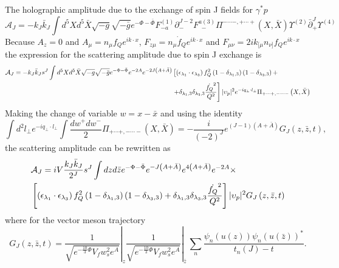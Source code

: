 \documentclass[a4paper,12pt]{article}
\begin{document}
The holographic amplitude due to the exchange of spin J fields for $\gamma^* p$
\begin{equation}
\mathcal{A}_J = - k_J \bar{k}_J \int d^5X d^5 \bar{X} \sqrt{-g} \sqrt{-\bar{g}} e^{-\Phi -\bar{\Phi}} F^{(1)}_{- a} \partial_{-}^{J-2} F^{a (3)}_{\, \, \, -} \Pi^{- \cdots -, + \cdots +} \left(X, \bar{X}\right) \Upsilon^{(2)} \bar{\partial}^J_{+} \Upsilon^{(4)}
\end{equation}
Because $A_z = 0$ and $A_\mu = n_\mu f_Q e^{i k \cdot x}$, $F_{z\mu} = n_\mu \dot{f}_Q e^{i k \cdot x}$ and $F_{\mu\nu} = 2 i k_{[\mu}n_{\nu]} f_Q e^{i k \cdot x}$
the expression for the scattering amplitude due to spin J exchange is
\begin{align}
\mathcal{A}_J = - k_J \bar{k}_J s^J \int d^5X d^5\bar{X} \sqrt{-g} \sqrt{-\bar{g}} e^{- \Phi - \bar{\Phi}} e^{-2A} e^{-2J\left(A+\bar{A}\right)} &\left[ \left( \epsilon_{\lambda_1} \cdot \epsilon_{\lambda_3}\right) f_Q^2 \left(1-\delta_{\lambda_1,3}\right) \left(1-\delta_{\lambda_3,3}\right) +  \right. \notag \\
&\left. + \delta_{\lambda_1,3} \delta_{\lambda_3, 3} \frac{\dot{f_Q}^2}{Q^2}\right] |\upsilon_p|^2 e^{-i q_\perp \cdot l_\perp} \Pi_{+ \cdots +, - \cdots -} \left(X, \bar{X}\right)
\end{align}
Making the change of variable $w = x - \bar{x}$  and using the identity
\begin{equation}
\int d^2 l_\perp e^{- i q_\perp \cdot l_\perp}\int \frac{dw^+ dw^-}{2} \Pi_{+\cdots+, - \cdots -} \left(X, \bar{X}\right) = - \frac{i}{\left(-2\right)^J} e^{\left(J-1\right)\left(A+\bar{A}\right)} G_J \left(z, \bar{z}, t\right),
\end{equation}
the scattering amplitude can be rewritten as
\begin{align}
&\mathcal{A}_J = i V \frac{k_J \bar{k}_J}{2^J} s^J \int dz d\bar{z} e^{-\Phi -\bar{\Phi}} e^{-J\left(A+\bar{A}\right)} e^{4\left(A+\bar{A}\right)} e^{-2A} \times  \notag \\
&\left[ \left( \epsilon_{\lambda_1} \cdot \epsilon_{\lambda_3}\right) f_Q^2 \left(1-\delta_{\lambda_1,3}\right) \left(1-\delta_{\lambda_3,3}\right) + \delta_{\lambda_1,3} \delta_{\lambda_3, 3} \frac{\dot{f_Q}^2}{Q^2}\right]  |\upsilon_p|^2 G_J \left(z, \bar{z}, t\right)
\end{align}
 where for the vector meson trajectory
\begin{equation}
G_J \left(z, \bar{z}, t \right)  = \left.\frac{1}{\sqrt{e^{-\frac{10}{3}\Phi} V_f w_s^2 e^A}}\right|_z  \left.\frac{1}{\sqrt{e^{-\frac{10}{3}\Phi} V_f w_s^2 e^A}}\right|_{\bar{z}} \, \sum_n \frac{\psi_n \left(u\left(z\right)\right){\psi_n \left(u\left(\bar{z}\right)\right)}^*}{t_n(J)-t}.
\end{equation}
\end{document}
